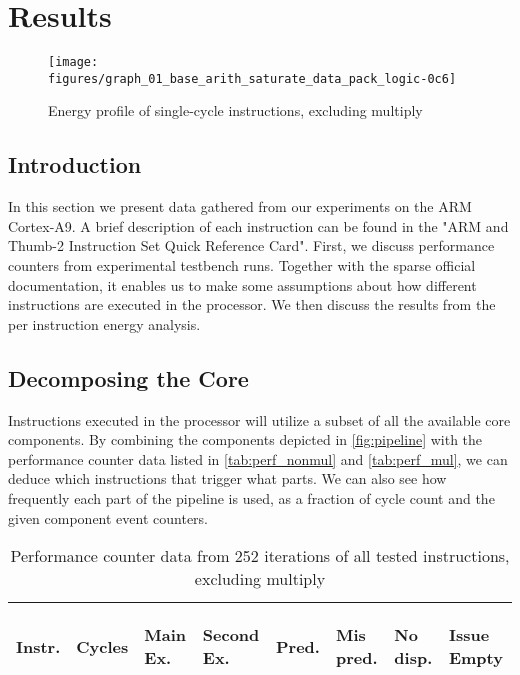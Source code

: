 \section{Results}

\begin{figure*}[ht]
    \centering
    \texttt{[image: figures/graph\_01\_base\_arith\_saturate\_data\_pack\_logic-0c6]}
    \caption{Energy profile of single-cycle instructions, excluding multiply}
    \label{fig:singlecycle}
\end{figure*}

\subsection{Introduction}
In this section we present data gathered from our experiments on the ARM
Cortex-A9. A brief description of each instruction can be found in the "ARM and
Thumb-2 Instruction Set Quick Reference Card"\cite{armasmref}. First, we discuss
performance counters from experimental testbench runs. Together with the sparse
official documentation, it enables us to make some assumptions about how
different instructions are executed in the processor. We then discuss the
results from the per instruction energy analysis.

\subsection{Decomposing the Core}
Instructions executed in the processor will utilize a subset
of all the available core components. By combining the components depicted in
\autoref{fig:pipeline} with the performance counter data listed in
\autoref{tab:perf_nonmul} and \autoref{tab:perf_mul}, we can deduce which
instructions that trigger what parts. We can also see how frequently each part
of the pipeline is used, as a fraction of cycle count and the given component
event counters.

\begin{table}
    \centering
    \begin{tabular}{|p{0.7cm}|R{0.8cm}R{0.6cm}R{0.85cm}R{0.6cm}R{0.45cm}R{0.75cm}R{0.72cm}|}
        \hline
        \centering
        Instr. &
        \centering
        Cycles &
        \centering
        Main Ex. &
        \centering
        Second Ex. &
        \centering
        Pred.&
        \centering
        Mis pred.&
        \centering
        No disp. &
        \begin{centering}
        Issue Empty
        \end{centering}
        \\
        \hline
        
        \hline
    \end{tabular}
    \caption{Performance counter data from 252 iterations of all tested
    instructions, excluding multiply}
    \label{tab:perf_nonmul}
    \hfill
\end{table}



